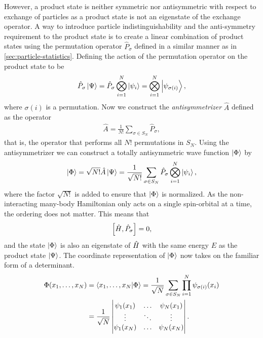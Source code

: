         However, a product state is neither symmetric nor antisymmetric with
        respect to exchange of particles as a product state is not an eigenstate
        of the exchange operator.
        A way to introduce particle indistinguishability and the anti-symmetry
        requirement to the product state is to create a linear combination of
        product states using the permutation operator $\hat{P}_{\sigma}$ defined
        in a similar manner as in \autoref{sec:particle-statistics}.
        Defining the action of the permutation operator on the product state to
        be
        \begin{align}
            \hat{P}_{\sigma}\ket{\Psi}
            = \hat{P}_{\sigma}\bigotimes_{i = 1}^{N}\ket{\psi_i}
            = \bigotimes_{i = 1}^{N}\ket{\psi_{\sigma(i)}},
        \end{align}
        where $\sigma(i)$ is a permutation.
        Now we construct the \emph{antisymmetrizer} $\hat{A}$ defined as the
        operator
        \begin{align}
            \hat{A} = \frac{1}{N!}\sum_{\sigma \in S_{N}}\hat{P}_{\sigma},
        \end{align}
        that is, the operator that performs all $N!$ permutations in $S_{N}$.
        Using the antisymmetrizer we can construct a totally antisymmetric wave
        function $\ket{\Phi}$ by
        \begin{align}
            \ket{\Phi}
            = \sqrt{N!}\hat{A}\ket{\Psi}
            = \frac{1}{\sqrt{N!}}\sum_{\sigma \in S_{N}}
            \hat{P}_{\sigma}
            \bigotimes_{i = 1}^{N}\ket{\psi_i},
        \end{align}
        where the factor $\sqrt{N!}$ is added to ensure that $\ket{\Phi}$ is
        normalized.
        As the non-interacting many-body Hamiltonian only acts on a single
        spin-orbital at a time, the ordering does not matter.
        This means that
        \begin{align}
            \left[\hat{H}, \hat{P}_{\sigma}\right] = 0,
        \end{align}
        and the state $\ket{\Phi}$ is also an eigenstate of $\hat{H}$ with the
        same energy $E$ as the product state $\ket{\Psi}$.
        The coordinate representation of $\ket{\Phi}$ now takes on the familiar
        form of a determinant.
        \begin{align}
            \Phi(x_1, \dots, x_N)
            &=
            \braket{x_1, \dots, x_N}{\Phi}
            = \frac{1}{\sqrt{N}}
            \sum_{\sigma \in S_{N}}
            \prod_{i = 1}^{N}
            \psi_{\sigma(i)}(x_i)
            \\
            &=
            \frac{1}{\sqrt{N}}
            \begin{vmatrix}
                \psi_1(x_1) & \dots & \psi_N(x_1) \\
                \vdots & \ddots & \vdots \\
                \psi_1(x_N) & \dots & \psi_N(x_N)
            \end{vmatrix}.
            \label{eq:coord_slater}
        \end{align}

